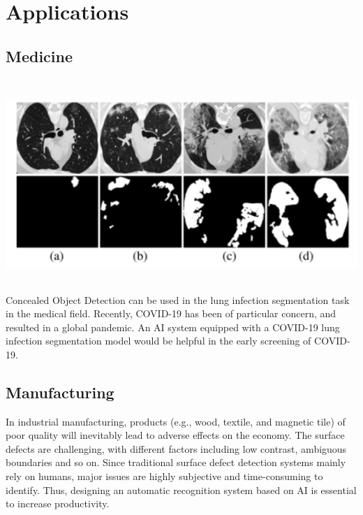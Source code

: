 
\vspace{1cm}
\section{{{\fontsize{17}{21}\selectfont \textbf{Applications\cite{pulla2020camouflaged}}}}}
\setlength{\columnsep}{1.5cm}

\begin{multicols}{2}
\vspace{0.5cm}
\subsection{{{\fontsize{14}{19}\selectfont \textbf{Medicine}}}}
\vspace{0.5cm}
\includegraphics[width=\columnwidth,height=8cm]{sections/LBP/use1.png}
\vspace{0.5cm}
Concealed Object Detection can be used in the lung infection segmentation task in the medical field. Recently, COVID-19 has been of particular concern, and resulted in a global pandemic. An AI system equipped with a COVID-19 lung infection segmentation model would be helpful in the early screening of COVID-19.

\vspace{0.5cm}
\subsection{{{\fontsize{14}{19}\selectfont \textbf{Manufacturing}}}}
In industrial manufacturing, products (e.g., wood, textile, and magnetic tile) of poor quality will inevitably lead to adverse effects on the economy. The surface defects are challenging, with different factors including low contrast, ambiguous boundaries and so on. Since traditional surface defect detection systems mainly rely on humans, major issues are highly subjective and time-consuming to identify.
Thus, designing an automatic recognition system based on AI is essential to increase productivity.


\end{multicols}
